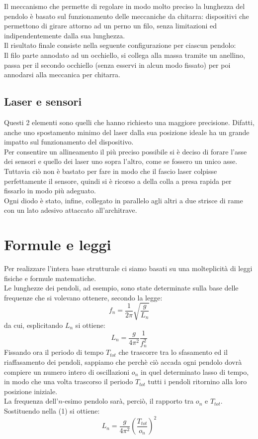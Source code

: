 \documentclass[a4paper]{article}
\begin{document}
Il meccanismo che permette di regolare in modo molto preciso la lunghezza del pendolo è basato sul funzionamento delle meccaniche da chitarra: dispositivi che permettono di girare attorno ad un perno un filo, senza limitazioni ed indipendentemente dalla sua lunghezza.\\
Il risultato finale consiste nella seguente configurazione per ciascun pendolo:\\

Il filo parte annodato ad un occhiello, si collega alla massa tramite un anellino, passa per il secondo occhiello (senza esservi in alcun modo fissato) per poi annodarsi alla meccanica per chitarra.

\subsection{Laser e sensori}

Questi 2 elementi sono quelli che hanno richiesto una maggiore precisione. Difatti, anche uno spostamento minimo del laser dalla sua posizione ideale ha un grande impatto sul funzionamento del dispositivo.\\

Per consentire un allineamento il più preciso possibile si è deciso di forare l'asse dei sensori e quello dei laser uno sopra l'altro, come se fossero un unico asse. Tuttavia ciò non è bastato per fare in modo che il fascio laser colpisse perfettamente il sensore, quindi si è ricorso a della colla a presa rapida per fissarlo in modo più adeguato.\\
Ogni diodo è stato, infine, collegato in parallelo agli altri a due strisce di rame con un lato adesivo attaccato all'architrave.

\section{Formule e leggi}

Per realizzare l'intera base strutturale ci siamo basati su una molteplicità di leggi fisiche e formule matematiche.\\
Le lunghezze dei pendoli, ad esempio, sono state determinate sulla base delle frequenze che si volevano ottenere, secondo la legge:
\[ f_n=\frac{1}{2\pi}\sqrt{\frac{g}{L_n}}\]
da cui, esplicitando $L_n$ si ottiene:
\begin{equation}
	 L_n=\frac{g}{4\pi^2}\frac{1}{f^2_n}
\end{equation}
Fissando ora il periodo di tempo $T_{tot}$ che trascorre tra lo sfasamento ed il riaffasamento dei pendoli, sappiamo che perchè ciò accada ogni pendolo dovrà compiere un numero intero di oscillazioni $o_n$ in quel determinato lasso di tempo, in modo che una volta trascorso il periodo $T_{tot}$ tutti i pendoli ritornino alla loro posizione iniziale.\\
La frequenza dell'$n$-esimo pendolo sarà, perciò, il rapporto tra $o_n$ e $T_{tot}$.
Sostituendo nella (1) si ottiene:
\begin{equation}
	 L_n=\frac{g}{4\pi^2}\left(\frac{T_{tot}}{o_n}\right)^2
\end{equation}
\end{document}
